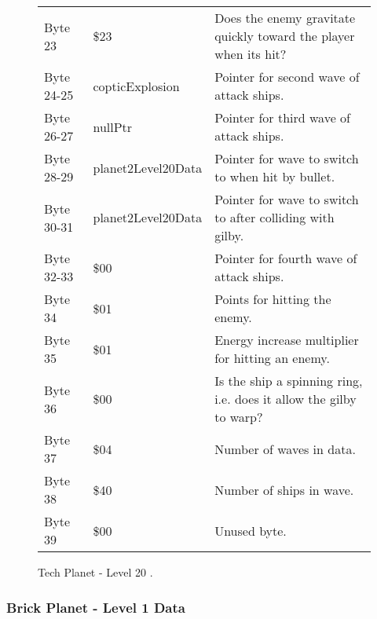 \begin{figure}[H]
{\begin{adjustbox}{width=12cm}
\begin{tabular}{lll}
 Byte 23    & \$23                & Does the enemy gravitate quickly toward the player when its hit?    \\
 Byte 24-25 & copticExplosion    & Pointer for second wave of attack ships.                            \\
 Byte 26-27 & nullPtr            & Pointer for third wave of attack ships.                             \\
 Byte 28-29 & planet2Level20Data & Pointer for wave to switch to when hit by bullet.                   \\
 Byte 30-31 & planet2Level20Data & Pointer for  wave to switch to after colliding with gilby.          \\
 Byte 32-33 & \$00                & Pointer for fourth wave of attack ships.                            \\
 Byte 34    & \$01                & Points for hitting the enemy.                                       \\
 Byte 35    & \$01                & Energy increase multiplier for hitting an enemy.                    \\
 Byte 36    & \$00                & Is the ship a spinning ring, i.e. does it allow the gilby to warp?  \\
 Byte 37    & \$04                & Number of waves in data.                                            \\
 Byte 38    & \$40                & Number of ships in wave.                                            \\
 Byte 39    & \$00                & Unused byte.                                                        \\
\bottomrule
\end{tabular}

  \end{adjustbox}

  }\caption*{Tech Planet - Level 20
.}
\end{figure}

\clearpage
\subsubsection{Brick Planet - Level 1 Data}

